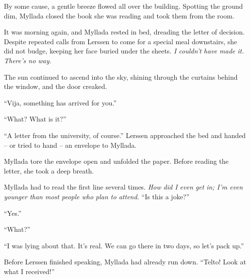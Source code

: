 By some cause, a gentle breeze flowed all over the building. Spotting the ground dim, Myllada closed the book she was reading and took them from the room.

\centeredstars

It was morning again, and Myllada rested in bed, dreading the letter of decision. Despite repeated calls from Lerssen to come for a special meal downstairs, she did not budge, keeping her face buried under the sheets. \emph{I couldn't have made it. There's no way.}

The sun continued to ascend into the sky, shining through the curtains behind the window, and the door creaked.

``Vija, something has arrived for you.''

``What? What is it?''

``A letter from the university, of course.'' Lerssen approached the bed and handed -- or tried to hand -- an envelope to Myllada.

Myllada tore the envelope open and unfolded the paper. Before reading the letter, she took a deep breath.


Myllada had to read the first line several times. \emph{How did I even get in; I'm even younger than most people who plan to attend.} ``Is this a joke?''

``Yes.''

``What?''

``I was lying about that. It's real. We can go there in two days, so let's pack up.''

Before Lerssen finished speaking, Myllada had already run down. ``Telto! Look at what I received!''

